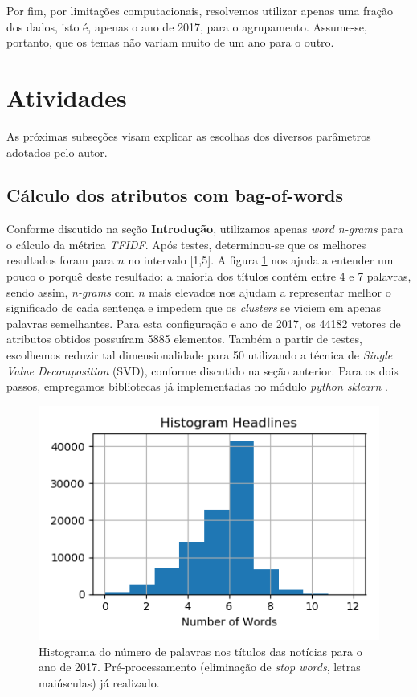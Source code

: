 \documentclass[10pt,twocolumn,letterpaper]{article}
\begin{document}
Por fim, por limitações computacionais, resolvemos utilizar apenas uma fração dos dados, isto é, apenas o ano de 2017, para o agrupamento. Assume-se, portanto, que os temas não variam muito de um ano para o outro.
\section{Atividades}

As próximas subseções visam explicar as escolhas dos diversos parâmetros adotados pelo autor.

\subsection {Cálculo dos atributos com bag-of-words}

Conforme discutido na seção \textbf {Introdução}, utilizamos apenas \textit{word n-grams} para o cálculo da métrica \textit{TFIDF}. Após testes, determinou-se que os melhores resultados foram para \(n\) no intervalo [1,5]. A figura \ref{img:hist} nos ajuda a entender um pouco o porquê deste resultado: a maioria dos títulos contém entre 4 e 7 palavras, sendo assim, \textit{n-grams} com \(n\) mais elevados nos ajudam a representar melhor o significado de cada sentença e impedem que os \textit{clusters} se viciem em apenas palavras semelhantes. Para esta configuração e ano de 2017, os 44182 vetores de atributos obtidos possuíram 5885 elementos. Também a partir de testes, escolhemos reduzir tal dimensionalidade para 50 utilizando a técnica de \textit{Single Value Decomposition} (SVD), conforme discutido na seção anterior. Para os dois passos, empregamos bibliotecas já implementadas no módulo \textit{python sklearn} \cite{scikit-learn}.

\begin{figure}
    \centering
    \includegraphics[width=\columnwidth]{figs/histograma_n_palavras}
    \caption{Histograma do número de palavras nos títulos das notícias para o ano de 2017. Pré-processamento (eliminação de \textit{stop words}, letras maiúsculas) já realizado.}
    \label{img:hist}
\end{figure}
\end{document}
